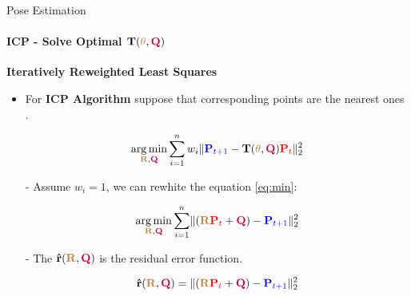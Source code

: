 \documentclass[aspectratio=169]{beamer}
\DeclareMathOperator*{\argmin}{arg\,min}
\newcommand{\tikzRot}{0}
\newcommand{\tikzTrans}{(0,0)}
\newcommand{\tikzShowrobot}{0}
\newcommand{\tikzOneCenter}{0}
\begin{document}
\begin{frame}[fragile, c]{Pose Estimation}
	\framesubtitle{ICP - Solve Optimal $\mathbf{T}(\textcolor{brown}{\theta}, \textcolor{purple}{\mathbf{Q}})$}
	\textbf{Iteratively Reweighted Least Squares}

	\begin{minipage}[t]{0.5\textwidth}
		\begin{figure}
			\resizebox{0.7\textwidth}{!}{
				\renewcommand{\tikzRot}{30}
				\renewcommand{\tikzTrans}{(8,0)}
				\renewcommand{\tikzShowrobot}{0}
				\renewcommand{\tikzOneCenter}{0}
				\resizebox{0.8\textwidth}{!}{
				}
			}
		\end{figure}
	\end{minipage}
	\begin{minipage}[t]{0.5\textwidth}

	\vspace{-0.2in}
	\begin{itemize}
		\item For \textbf{ICP Algorithm} suppose that corresponding points are the nearest ones \cite{prochazkova2018notes}.

	\vspace{-0.2in}
	\begin{equation}
		\argmin\limits_{\textcolor{brown}{\mathbf{R}}, \textcolor{purple}{\mathbf{Q}}} \sum\limits_{i=1}^n w_i \lVert \textcolor{blue}{\mathbf{P}_{t+1}}
		- \mathbf{T}(\textcolor{brown}{\theta}, \textcolor{purple}{\mathbf{Q}})
		\textcolor{red}{\mathbf{P}_{t}} \rVert^2_2
		\label{eq:min}
	\end{equation}

	\item[-] Assume $w_i = 1$, we can rewhite the equation \ref{eq:min}:

	\vspace{-0.2in}
	\begin{equation*}
		\argmin\limits_{\textcolor{brown}{\mathbf{R}}, \textcolor{purple}{\mathbf{Q}}} \sum\limits_{i=1}^n  
		\lVert (\textcolor{brown}{\mathbf{R}}\textcolor{red}{\mathbf{P}_{t}}  + \textcolor{purple}{\mathbf{Q}})
		-  \textcolor{blue}{\mathbf{P}_{t+1}}\rVert^2_2
	\end{equation*}

	\item[-] The $\mathbf{\hat{r}}(\textcolor{brown}{\mathbf{R}}, \textcolor{purple}{\mathbf{Q}})$ is the residual error function.
	
	\vspace{-0.2in}
	\begin{equation*}
		\mathbf{\hat{r}}(\textcolor{brown}{\mathbf{R}}, \textcolor{purple}{\mathbf{Q}}) = 
		\lVert (\textcolor{brown}{\mathbf{R}}\textcolor{red}{\mathbf{P}_{t}}  + \textcolor{purple}{\mathbf{Q}})
		-  \textcolor{blue}{\mathbf{P}_{t+1}} \rVert ^2_2
	\end{equation*}

	\end{itemize}
	\end{minipage}
\end{frame}
\end{document}
